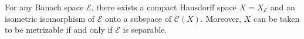 For any Banach space $\mathcal{E}$, there exists a compact Hausdorff space $X = X_{\mathcal{E}}$ and an isometric isomorphism of $\mathcal{E}$ onto a subspace of $\mathcal{C}(X)$. Moreover, $X$ can be taken to be metrizable if and only if $\mathcal{E}$ is separable.
